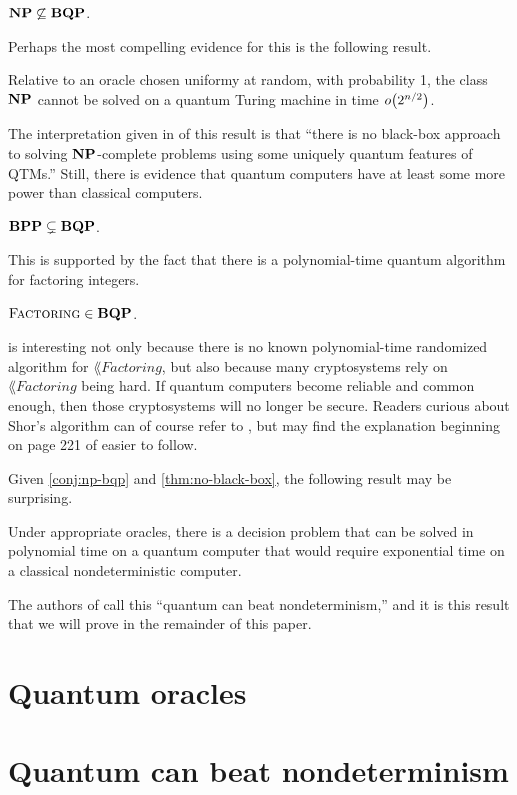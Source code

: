 \documentclass[12pt]{article}
\begin{document}
\begin{conj}
  \label{conj:np-bqp}
  $\mathbf{NP} \not\subseteq \mathbf{BQP}$.
\end{conj}

Perhaps the most compelling evidence for this is the following result.

\begin{thm}
  \label{thm:no-black-box}
  Relative to an oracle chosen uniformy at random, with probability 1, the class
  $\mathbf{NP}$ cannot be solved on a quantum Turing machine in time $\smallo{2^{n/2}}$.
\end{thm}

The interpretation given in \cite{BBBV97} of this result is that ``there is no
black-box approach to solving $\mathbf{NP}$-complete problems using some uniquely
quantum features of QTMs.'' Still, there is evidence that quantum computers have
at least some more power than classical computers.

\begin{conj}
  $\mathbf{BPP} \subsetneq \mathbf{BQP}$.
\end{conj}

This is supported by the fact that there is a polynomial-time quantum algorithm
for factoring integers.

\begin{thm}
  \label{thm:shor}
  $\textsc{Factoring} \in \mathbf{BQP}$.
\end{thm}

 is interesting not only because there is no known
polynomial-time randomized algorithm for $\lang{Factoring}$, but also because
many cryptosystems rely on $\lang{Factoring}$ being hard. If quantum computers
become reliable and common enough, then those cryptosystems will no longer be
secure. Readers curious about Shor's algorithm can of course refer to
\cite{Sho97}, but may find the explanation beginning on page 221 of \cite{AB09}
easier to follow.

Given \cref{conj:np-bqp} and \cref{thm:no-black-box}, the following result may
be surprising.

\begin{thm}[\cite{BB92}]
  Under appropriate oracles, there is a decision problem that can be solved in
  polynomial time on a quantum computer that would require exponential time on a
  classical nondeterministic computer.
\end{thm}
The authors of \cite{BB92} call this ``quantum can beat nondeterminism,'' and it
is this result that we will prove in the remainder of this paper.

\section{Quantum oracles}


\section{Quantum can beat nondeterminism \cite{BB92}}


\nocite{*}


\end{document}
